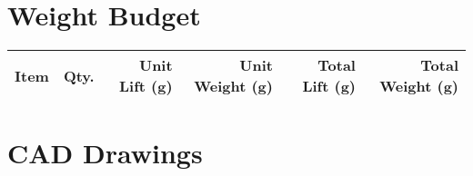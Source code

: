 \documentclass{article}
\begin{document}
\section{Weight Budget}

	\begin{tabular}{ l c r r r r }
		\textbf{Item} & \textbf{Qty.} & \textbf{Unit Lift (g)} & \textbf{Unit Weight (g)}  & \textbf{Total Lift (g)} & \textbf{Total Weight (g)}\\ \hline
	\end{tabular}
	
\section{CAD Drawings}
\end{document}
